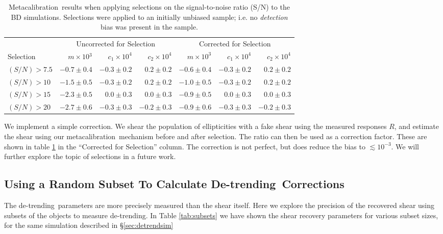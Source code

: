 \documentclass[usegraphicx,usenatbib]{mn2e}
\newcommand{\mcal}{metacalibration}
\newcommand{\Mcal}{Metacalibration}
\newcommand{\mcalR}{$R$}
\newcommand{\detrend}{de-trending}
\newcommand{\Detrend}{De-trending}
\begin{document}
\begin{table}
    \centering
    \caption{\Mcal\ results when applying selections on the signal-to-noise ratio (S/N) to the BD simulations. Selections
    were applied to an initially unbiased sample; i.e. no {\em detection}
    bias was present in the sample. \label{tab:selresults}}
    \begin{tabular}{ |l| r|r|r|  r|r|r|}
        \hline
        & \multicolumn{3}{c}{Uncorrected for Selection} & \multicolumn{3}{c}{Corrected for Selection} \\
        Selection & $m \times 10{^3} $ & $c_1 \times 10^4$ & $c_2 \times 10^4$ & $m \times 10^{3}$ & $c_1 \times 10^4$ & $c_2 \times 10^4$ \\
        \hline
        $(S/N) > 7.5$  & $-0.7 \pm 0.4$ & $-0.3 \pm 0.2$ & $0.2 \pm 0.2$ & $-0.6 \pm 0.4$ & $-0.3 \pm 0.2$ & $0.2 \pm 0.2$  \\
        $(S/N) > 10$   & $-1.5 \pm 0.5$ & $-0.3 \pm 0.2$ & $0.2 \pm 0.2$ & $-1.0 \pm 0.5$ & $-0.3 \pm 0.2$ & $0.2 \pm 0.2$  \\
        $(S/N) > 15$   & $-2.3 \pm 0.5$ & $0.0 \pm 0.3$ & $0.0 \pm 0.3$ & $-0.9 \pm 0.5$ & $0.0 \pm 0.3$ & $0.0 \pm 0.3$  \\
        $(S/N) > 20$   & $-2.7 \pm 0.6$ & $-0.3 \pm 0.3$ & $-0.2\pm 0.3$ & $-0.9 \pm 0.6$ & $-0.3 \pm 0.3$ & $-0.2 \pm 0.3$  \\
    \end{tabular}
\end{table}

We implement a simple correction.  We shear the population of ellipticities
with a fake shear using the measured responses \mcalR, and estimate the shear
using our \mcal\ mechanism before and after selection.  The ratio can then be
used as a correction factor.  These are shown in table \ref{tab:selresults} in
the ``Corrected for Selection'' column.  The correction is not perfect, but
does reduce the bias to $\lesssim 10^{-3}$.  We will further explore the topic
of selections in a future work.


\subsection{Using a Random Subset To Calculate \Detrend\ Corrections}

The \detrend\ parameters are more precisely measured than the shear itself.
Here we explore the precision of the recovered shear using subsets of the
objects to measure \detrend.  In Table \ref{tab:subsets} we have shown the
shear recovery parameters for various subset sizes, for the same simulation
described in \S \ref{sec:detrendsim}
\end{document}

